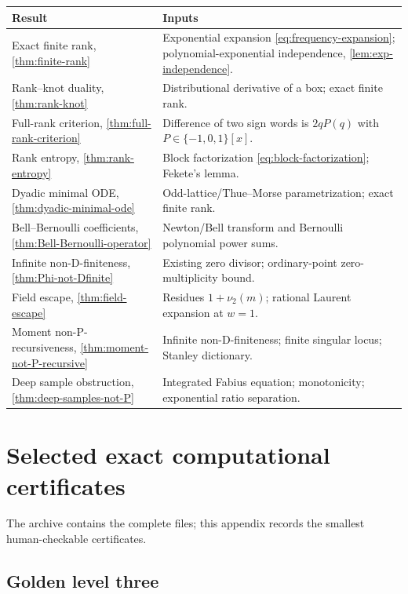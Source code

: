 \documentclass[11pt]{article}
\numberwithin{equation}{section}
\theoremstyle{definition}
\theoremstyle{remark}
\begin{document}
\begin{center}
\begin{tabularx}{\textwidth}{>{\raggedright\arraybackslash}p{}X}
\toprule
Result & Inputs\\
\midrule
Exact finite rank, \cref{thm:finite-rank}
 & Exponential expansion \eqref{eq:frequency-expansion};
   polynomial-exponential independence, \cref{lem:exp-independence}.\\
Rank--knot duality, \cref{thm:rank-knot}
 & Distributional derivative of a box; exact finite rank.\\
Full-rank criterion, \cref{thm:full-rank-criterion}
 & Difference of two sign words is $2qP(q)$ with
   $P\in\{-1,0,1\}[x]$.\\
Rank entropy, \cref{thm:rank-entropy}
 & Block factorization \eqref{eq:block-factorization}; Fekete's lemma.\\
Dyadic minimal ODE, \cref{thm:dyadic-minimal-ode}
 & Odd-lattice/Thue--Morse parametrization; exact finite rank.\\
Bell--Bernoulli coefficients, \cref{thm:Bell-Bernoulli-operator}
 & Newton/Bell transform and Bernoulli polynomial power sums.\\
Infinite non-D-finiteness, \cref{thm:Phi-not-Dfinite}
 & Existing zero divisor; ordinary-point zero-multiplicity bound.\\
Field escape, \cref{thm:field-escape}
 & Residues $1+\nu_2(m)$; rational Laurent expansion at $w=1$.\\
Moment non-P-recursiveness, \cref{thm:moment-not-P-recursive}
 & Infinite non-D-finiteness; finite singular locus; Stanley dictionary.\\
Deep sample obstruction, \cref{thm:deep-samples-not-P}
 & Integrated Fabius equation; monotonicity; exponential ratio separation.\\
\bottomrule
\end{tabularx}
\end{center}

\section{Selected exact computational certificates}
\label{app:certificates}

The archive contains the complete files; this appendix records the smallest
human-checkable certificates.

\subsection{Golden level three}
\end{document}
